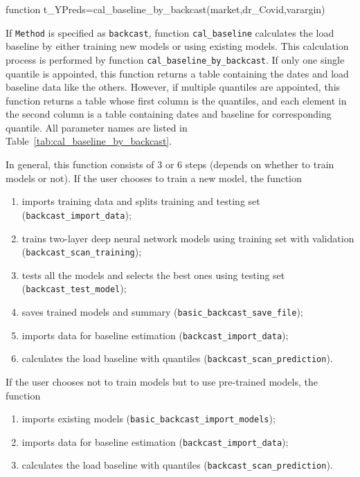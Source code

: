 \documentclass[10pt]{article}
\numberwithin{equation}{section}
\numberwithin{table}{section}
\numberwithin{figure}{section}
\begin{document}
\begin{Code}
function t_YPreds=cal_baseline_by_backcast(market,dr_Covid,varargin)
\end{Code}

If \verb!Method! is specified as \verb!backcast!, function \verb!cal_baseline! calculates the load baseline by either training new models or using existing models. This calculation process is performed by function \verb!cal_baseline_by_backcast!. If only one single quantile is appointed, this function returns a table containing the dates and load baseline data like the others. However, if multiple quantiles are appointed, this function returns a table whose first column is the quantiles, and each element in the second column is a table containing dates and baseline for corresponding quantile. All parameter names are listed in Table~\ref{tab:cal_baseline_by_backcast}.

In general, this function consists of 3 or 6 steps (depends on whether to train models or not). If the user chooses to train a new model, the function

\begin{enumerate}
    \item imports training data and splits training and testing set (\verb!backcast_import_data!);
    \item trains two-layer deep neural network models using training set with validation (\verb!backcast_scan_training!);
    \item tests all the models and selects the best ones using testing set (\verb!backcast_test_model!);
    \item saves trained models and summary (\verb!basic_backcast_save_file!);
    \item imports data for baseline estimation (\verb!backcast_import_data!);
    \item calculates the load baseline with quantiles (\verb!backcast_scan_prediction!).
\end{enumerate}

If the user chooses not to train models but to use pre-trained models, the function

\begin{enumerate}
    \item imports existing models (\verb!basic_backcast_import_models!);
    \item imports data for baseline estimation (\verb!backcast_import_data!);
    \item calculates the load baseline with quantiles (\verb!backcast_scan_prediction!).
\end{enumerate}
\end{document}
